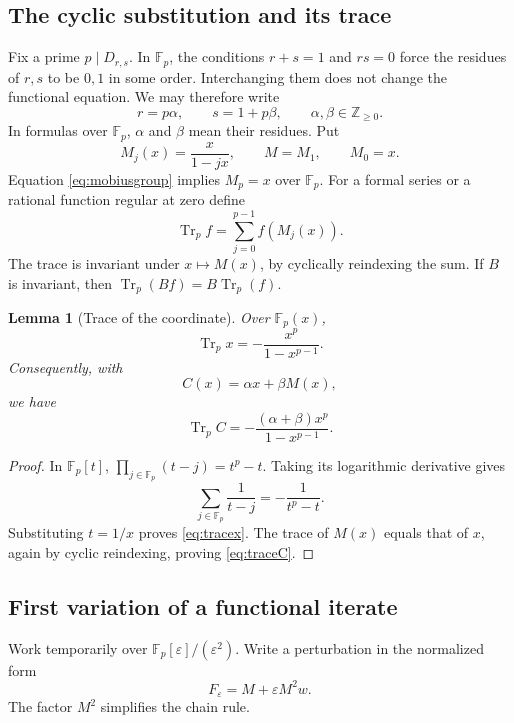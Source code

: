\documentclass[11pt,letterpaper]{article}
\newtheorem{lemma}[theorem]{Lemma}
\theoremstyle{definition}
\theoremstyle{remark}
\newcommand{\Z}{\mathbb Z}
\newcommand{\F}{\mathbb F}
\DeclareMathOperator{\Tr}{Tr}
\begin{document}
\subsection{The cyclic substitution and its trace}
Fix a prime $p\mid D_{r,s}$.  In $\F_p$, the conditions
$r+s=1$ and $rs=0$ force the residues of $r,s$ to be $0,1$ in some
order.  Interchanging them does not change the functional equation.
We may therefore write
\begin{equation}\label{eq:alphabeta}
 r=p\alpha,\qquad s=1+p\beta,
 \qquad \alpha,\beta\in\Z_{\geq0}.
\end{equation}
In formulas over $\F_p$, $\alpha$ and $\beta$ mean their residues.
Put
\[
 M_j(x)=\frac{x}{1-jx},\qquad M=M_1,\qquad M_0=x.
\]
Equation \eqref{eq:mobiusgroup} implies $M_p=x$ over $\F_p$.
For a formal series or a rational function regular at zero define
\begin{equation}\label{eq:trace}
 \Tr_p f=\sum_{j=0}^{p-1}f(M_j(x)).
\end{equation}
The trace is invariant under $x\mapsto M(x)$, by cyclically reindexing
the sum.  If $B$ is invariant, then
$\Tr_p(Bf)=B\Tr_p(f)$.

\begin{lemma}[Trace of the coordinate]\label{lem:tracex}
Over $\F_p(x)$,
\begin{equation}\label{eq:tracex}
 \Tr_p x=-\frac{x^p}{1-x^{p-1}}.
\end{equation}
Consequently, with
\begin{equation}\label{eq:C}
 C(x)=\alpha x+\beta M(x),
\end{equation}
we have
\begin{equation}\label{eq:traceC}
 \Tr_p C=-\frac{(\alpha+\beta)x^p}{1-x^{p-1}}.
\end{equation}
\end{lemma}
\begin{proof}
In $\F_p[t]$,
$\prod_{j\in\F_p}(t-j)=t^p-t$.  Taking its logarithmic derivative gives
\[
 \sum_{j\in\F_p}\frac1{t-j}=-\frac1{t^p-t}.
\]
Substituting $t=1/x$ proves \eqref{eq:tracex}.  The trace of $M(x)$
equals that of $x$, again by cyclic reindexing, proving
\eqref{eq:traceC}.
\end{proof}

\subsection{First variation of a functional iterate}
Work temporarily over $\F_p[\varepsilon]/(\varepsilon^2)$.  Write a
perturbation in the normalized form
\[
 F_\varepsilon=M+\varepsilon M^2w.
\]
The factor $M^2$ simplifies the chain rule.
\end{document}
